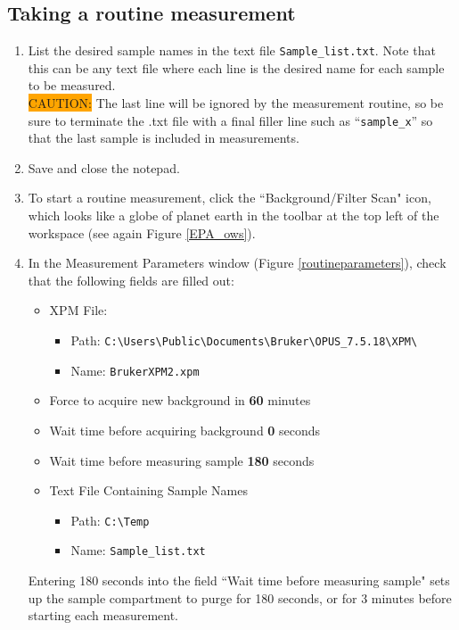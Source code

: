\subsection{Taking a routine measurement}
\label{subsec:measurement}
\begin{enumerate}
    \item List the desired sample names in the text file \verb|Sample_list.txt|. Note that this can be any text file where each line is the desired name for each sample to be measured. \\ \colorbox{orange}{CAUTION:} The last line will be ignored by the measurement routine, so be sure to terminate the .txt file with a final filler line such as ``\verb|sample_x|” so that the last sample is included in measurements.
    \item Save and close the notepad.
    \item To start a routine measurement, click the ``Background/Filter Scan" icon, which looks like a globe of planet earth in the toolbar at the top left of the workspace (see again Figure \ref{EPA_ows}).
    \item In the Measurement Parameters window (Figure \ref{routineparameters}), check that the following fields are filled out:
    \begin{itemize}
        \item XPM File:
        \begin{itemize}
            \item Path: \verb|C:\Users\Public\Documents\Bruker\OPUS_7.5.18\XPM\|
            \item Name: \verb|BrukerXPM2.xpm|
        \end{itemize}
        \item Force to acquire new background in \textbf{60} minutes
        \item Wait time before acquiring background \textbf{0} seconds
        \item Wait time before measuring sample \textbf{180} seconds
        \item Text File Containing Sample Names
        \begin{itemize}
            \item Path: \verb|C:\Temp|
            \item Name: \verb|Sample_list.txt|
        \end{itemize}
    \end{itemize}
    Entering 180 seconds into the field ``Wait time before measuring sample" sets up the sample compartment to purge for 180 seconds, or for 3 minutes before starting each measurement.

\end{enumerate}
